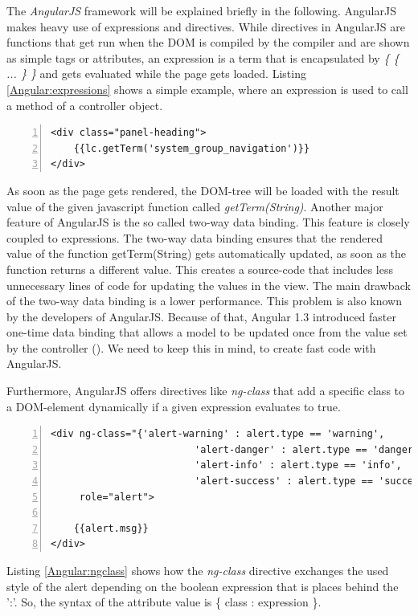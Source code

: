 The \textit{AngularJS} framework will be explained briefly in the following. AngularJS makes heavy use of expressions and directives.
While directives in AngularJS are functions that get run when the DOM is compiled by the compiler and are shown as simple tags or attributes, an expression is a term that is encapsulated by \textit{\{ \{ ... \} \}} and gets evaluated while the page gets loaded. Listing \ref{Angular:expressions} shows a simple example, where an expression is used to call a method of a controller object.

\begin{lstlisting}[numbers=left,caption={Simple example that shows the use of expressions.},label=Angular:expressions,frame=tlbr,breaklines]
<div class="panel-heading"> 
	{{lc.getTerm('system_group_navigation')}} 
</div>
\end{lstlisting}

As soon as the page gets rendered, the \ac{DOM}-tree will be loaded with the result value of the given javascript function called \textit{getTerm(String)}. 
Another major feature of AngularJS is the so called two-way data binding. This feature is closely coupled to expressions. The two-way data binding ensures that the rendered value of the function getTerm(String) gets automatically updated, as soon as the function returns a different value. This creates a source-code that includes less unnecessary lines of code for updating the values in the view. The main drawback of the two-way data binding is a lower performance. This problem is also known by the developers of AngularJS. Because of that, Angular 1.3 introduced faster one-time data binding that allows a model to be updated once from the value set by the controller (\cite{Peterson:2015aa}). We need to keep this in mind, to create fast code with AngularJS.

Furthermore, AngularJS offers directives like \textit{ng-class} that add a specific class to a \ac{DOM}-element dynamically if a given expression evaluates to true.

\begin{lstlisting}[numbers=left,caption={Simple example that shows the ng-class directive to change the style respectivly color of an alert depending on its type.},label=Angular:ngclass,frame=tlbr,breaklines]
<div ng-class="{'alert-warning' : alert.type == 'warning',
                         'alert-danger' : alert.type == 'danger',
                         'alert-info' : alert.type == 'info',
                         'alert-success' : alert.type == 'success'}"
     role="alert">

	{{alert.msg}}
</div>
\end{lstlisting}
Listing \ref{Angular:ngclass} shows how the \textit{ng-class} directive exchanges the used style of the alert depending on the boolean expression that is places behind the ':'. So, the syntax of the attribute value is \{ class : expression \}.

